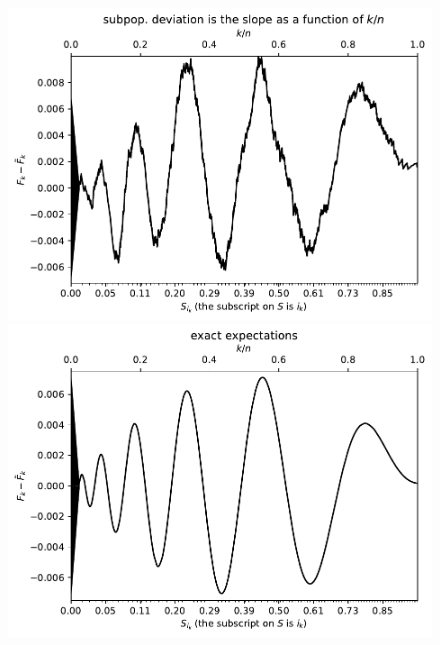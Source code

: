 \documentclass{article}
\begin{document}
\begin{figure}
\begin{centering}

\parbox{\imsize}{\includegraphics[width=\imsize]
                 {./codes/unweighted/50000_3300_10_2/cumulative.pdf}}
\quad\quad
\parbox{\imsize}{\includegraphics[width=\imsize]
                 {./codes/unweighted/50000_3300_10_2/cumulative_exact.pdf}}

\vspace{\vertsep}


\end{centering}
\end{figure}
\end{document}
